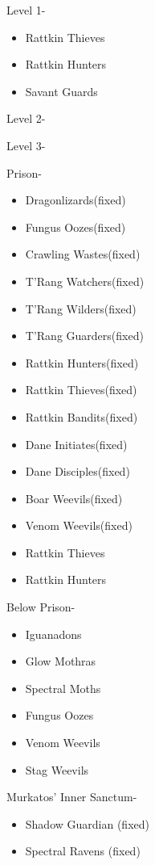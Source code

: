 \documentclass[12pt]{article}
\providecommand{\tightlist}{%
  \setlength{\itemsep}{0pt}\setlength{\parskip}{0pt}}
\begin{document}
Level 1-

\begin{itemize}
\tightlist
\item
  Rattkin Thieves
\item
  Rattkin Hunters
\item
  Savant Guards
\end{itemize}

Level 2-

Level 3-

Prison-

\begin{itemize}
\tightlist
\item
  Dragonlizards(fixed)
\item
  Fungus Oozes(fixed)
\item
  Crawling Wastes(fixed)
\item
  T'Rang Watchers(fixed)
\item
  T'Rang Wilders(fixed)
\item
  T'Rang Guarders(fixed)
\item
  Rattkin Hunters(fixed)
\item
  Rattkin Thieves(fixed)
\item
  Rattkin Bandits(fixed)
\item
  Dane Initiates(fixed)
\item
  Dane Disciples(fixed)
\item
  Boar Weevils(fixed)
\item
  Venom Weevils(fixed)
\item
  Rattkin Thieves
\item
  Rattkin Hunters
\end{itemize}

Below Prison-

\begin{itemize}
\tightlist
\item
  Iguanadons
\item
  Glow Mothras
\item
  Spectral Moths
\item
  Fungus Oozes
\item
  Venom Weevils
\item
  Stag Weevils
\end{itemize}

Murkatos' Inner Sanctum-

\begin{itemize}
\tightlist
\item
  Shadow Guardian (fixed)
\item
  Spectral Ravens (fixed)
\end{itemize}
\end{document}
